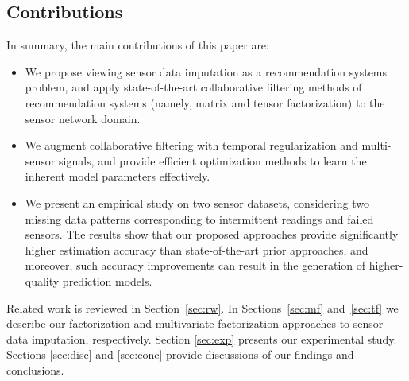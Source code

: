 
\subsection{Contributions}

In summary, the main contributions of this paper are:
\begin{itemize}
\item We propose viewing sensor data imputation as a recommendation systems problem, and apply state-of-the-art collaborative filtering methods of recommendation systems (namely, matrix and tensor factorization) to the sensor network domain.
\item We augment collaborative filtering with temporal regularization and multi-sensor signals, and provide efficient optimization methods to learn the inherent model parameters effectively.
\item We present an empirical study on two sensor datasets, considering two
missing data patterns corresponding to intermittent readings and failed
sensors. The results show that our proposed approaches provide
significantly higher estimation accuracy than state-of-the-art prior
approaches, and moreover, such accuracy improvements can result in the
generation of higher-quality prediction models.
\end{itemize}



Related work is reviewed in Section~\ref{sec:rw}.  In Sections~\ref{sec:mf} and~\ref{sec:tf} 
we describe our factorization and multivariate factorization
approaches to sensor data imputation, respectively. Section \ref{sec:exp} presents our experimental study. 
Sections \ref{sec:disc} and \ref{sec:conc} provide discussions of our findings and conclusions.

